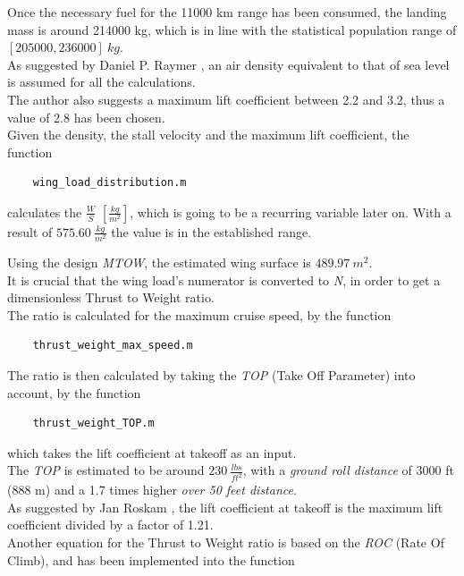 \documentclass{article}
\begin{document}
 Once the necessary fuel for the 11000 km range has been consumed, the landing mass is around 214000 kg,
 which is in line with the statistical population range of $[205000, 236000] \ kg$.\\ 
 As suggested by Daniel P. Raymer \autocite{Raymer_Daniel}, an air density equivalent
 to that of sea level is assumed for all the calculations. \\ 
 The author also suggests a maximum lift coefficient between 2.2 and 3.2, thus a value
 of 2.8 has been chosen.\\ 
 Given the density, the stall velocity and the maximum lift coefficient, the function \autocite{Airbus_replacement_repo}
 \begin{verbatim}
    wing_load_distribution.m
 \end{verbatim}
calculates the $\frac{W}{S}$  $[\frac{kg}{m^2}]$, which is going to be a recurring variable later on.
With a result of $575.60 \ \frac{kg}{m^2}$ the value is in the established range. 

Using the design \textit{MTOW}, the estimated wing surface is $489.97 \ m^2$. \\ 

It is crucial that the wing load's numerator is converted to \textit{N}, in order to get a dimensionless
Thrust to Weight ratio.\\ 
The ratio is calculated for the maximum cruise speed, by the function 
\begin{verbatim}
    thrust_weight_max_speed.m
\end{verbatim}



\clearpage

The ratio is then calculated by taking the \textit{TOP} (Take Off Parameter) into account, by the function 
\begin{verbatim}
    thrust_weight_TOP.m
\end{verbatim}
which takes the lift coefficient at takeoff as an input.\\ 

The \textit{TOP} is estimated to be around $230 \ \frac{lbs}{ft^2}$, with a \textit{ground roll distance}
of 3000 ft (888 m) and a 1.7 times higher \textit{over 50 feet distance}.\\ 
As suggested by Jan Roskam \autocite{Roskam}, the lift coefficient at takeoff is the maximum lift coefficient
divided by a factor of 1.21. \\ 

Another equation for the Thrust to Weight ratio is based on the \textit{ROC} (Rate Of Climb), 
and has been implemented into the function
\end{document}
